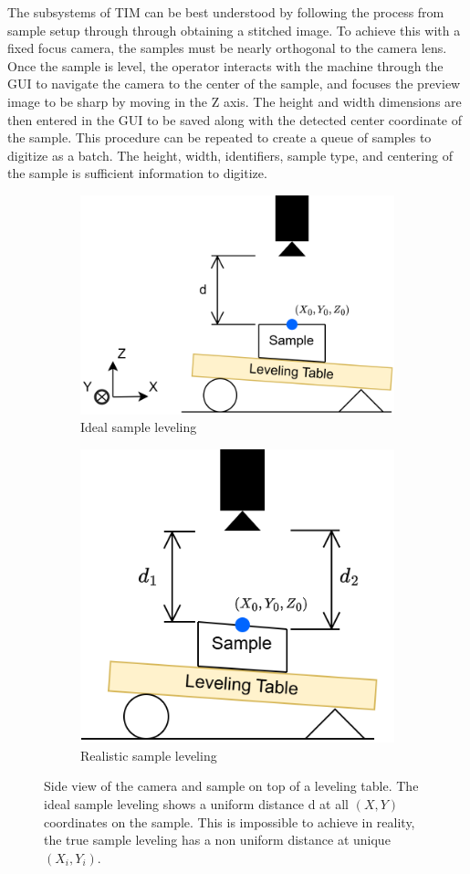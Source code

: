 \documentclass[a4paper,12pt]{article}
\begin{document}
The subsystems of TIM can be best understood by following the process from sample setup through through obtaining a stitched image. 
To achieve this with a fixed focus camera, the samples must be nearly orthogonal to the camera lens. 
Once the sample is level, the operator interacts with the machine through the GUI to navigate the camera to the center of the sample, and focuses the preview image to be sharp by moving in the Z axis. The height and width dimensions are then entered in the GUI
to be saved along with the detected center coordinate of the sample. This procedure can be repeated to create a queue of samples to digitize as a batch.
The height, width, identifiers, sample type, and centering of the sample is sufficient information to digitize.

\begin{figure}
    \centering
    \begin{subfigure}{.5\textwidth}
      \centering
      \includegraphics[height=0.5\linewidth]{../diagrams/sample_setup_ideal.png}
      \caption{Ideal sample leveling}
      \label{fig:ideal_levelling}
    \end{subfigure}%
    \begin{subfigure}{.5\textwidth}
      \centering
      \includegraphics[height=0.5\linewidth]{../diagrams/sample_setup_realistic.png}
      \caption{Realistic sample leveling}
      \label{fig:realistic_levelling}
    \end{subfigure}
    \caption{Side view of the camera and sample on top of a leveling table. The ideal sample leveling shows a uniform distance d at all $(X,Y)$ coordinates on the sample. This is impossible to achieve in reality, the true sample leveling has a non uniform distance at unique $(X_i, Y_i)$.}
    \label{fig:sample_levelling}
\end{figure}
\end{document}

